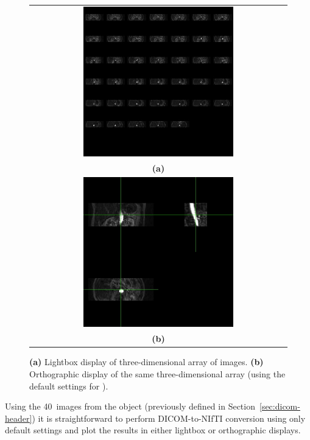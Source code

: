 \documentclass[article,nojss,shortnames]{jss}
\begin{document}
\begin{figure}[tbp]
  \begin{center}
    \begin{tabular}{c}
    \includegraphics*[width=0.6\textwidth]{hk40n_image.jpeg}\\
    \textbf{(a)}\\
    \includegraphics*[width=0.6\textwidth]{hk40n_orthographic.jpeg}\\
    \textbf{(b)}
    \end{tabular}
  \end{center}
  \caption{\textbf{(a)} Lightbox display of three-dimensional array of
    images.  \textbf{(b)} Orthographic display of the same
    three-dimensional array (using the default settings for
    ).}
  \label{fig:hk40n}
\end{figure}

Using the 40~images from the  object (previously defined in
Section~\ref{sec:dicom-header}) it is straightforward to perform
DICOM-to-NIfTI conversion using only default settings and plot the
results in either lightbox or orthographic displays.
\end{document}
